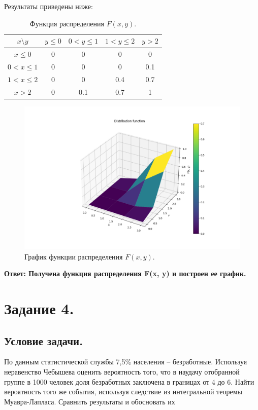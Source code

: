 \documentclass[a4paper, 12pt]{article}
\begin{document}
    Результаты приведены ниже:
    \begin{table}[h]
        \centering
        \begin{tabular}{|c|c|c|c|c|}
        \hline
        $x \text{\textbackslash} y$ & $y\leq0$ & $0<y\leq1$ & $1<y\leq2$ & $y>2$ \\
        \hline
        $x\leq0$ & 0 & 0 & 0 & 0\\
        \hline
        $0<x\leq1$ & 0 & 0 & 0 & 0.1\\
        \hline
        $1<x\leq2$ & 0 & 0 & 0.4 & 0.7\\
        \hline
        $x>2$ & 0 & 0.1 & 0.7 & 1\\
        \hline
        \end{tabular}
        \caption{Функция распределения $F(x,y)$.}
        \label{tab:F_x}
    \end{table}
    \begin{figure}[H]
        \centering
        \includegraphics[scale=0.5]{disf.png}
        \captionsetup{skip=0pt}
        \caption{График функции распределения $F(x,y)$.}
        \label{fig:F_xg}
    \end{figure}


    \textbf{Ответ: Получена функция распределения F(x, y) и построен ее график.}


    \section{Задание 4.}
    \subsection{Условие задачи.}
    По данным статистической службы 7,5\% населения -- безработные.
    Используя неравенство Чебышева оценить вероятность того, что в
    наудачу отобранной группе в 1000 человек доля безработных заключена
    в границах от 4 до 6. Найти вероятность того же события, используя
    следствие из интегральной теоремы Муавра-Лапласа. Сравнить
    результаты и обосновать их
\end{document}

